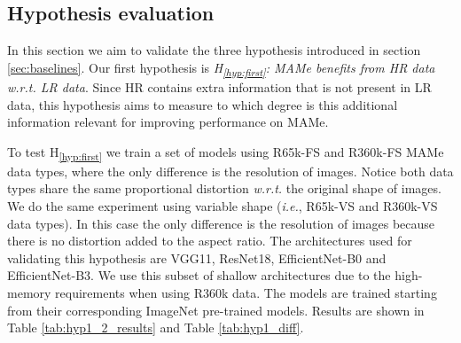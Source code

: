 \documentclass{article}
\newcommand{\hypref}[1]{\textup{H\textsubscript{\ref{#1}}}}
\newcommand{\wrt}{{\it w.r.t. }}    \newcommand{\eg}{\emph{e.g.}, }     \newcommand{\ie}{\emph{i.e.}, }     \newcommand{\etal}{\emph{et al.}}   \newcommand\etc{\emph{etc.}}
\begin{document}
\subsection{Hypothesis evaluation} \label{sec:exp_res}

In this section we aim to validate the three hypothesis introduced in section \ref{sec:baselines}. Our first hypothesis is \textit{\hypref{hyp:first}: MAMe benefits from HR data \wrt LR data}. Since HR contains extra information that is not present in LR data, this hypothesis aims to measure to which degree is this additional information relevant for improving performance on MAMe.

To test \hypref{hyp:first} we train a set of models using R65k-FS and R360k-FS MAMe data types, where the only difference is the resolution of images. Notice both data types share the same proportional distortion \wrt the original shape of images. We do the same experiment using variable shape (\ie R65k-VS and R360k-VS data types). In this case the only difference is the resolution of images because there is no distortion added to the aspect ratio. The architectures used for validating this hypothesis are VGG11, ResNet18, EfficientNet-B0 and EfficientNet-B3. We use this subset of shallow architectures due to the high-memory requirements when using R360k data. The models are trained starting from their corresponding ImageNet pre-trained models. Results are shown in Table \ref{tab:hyp1_2_results} and Table \ref{tab:hyp1_diff}.
\end{document}
